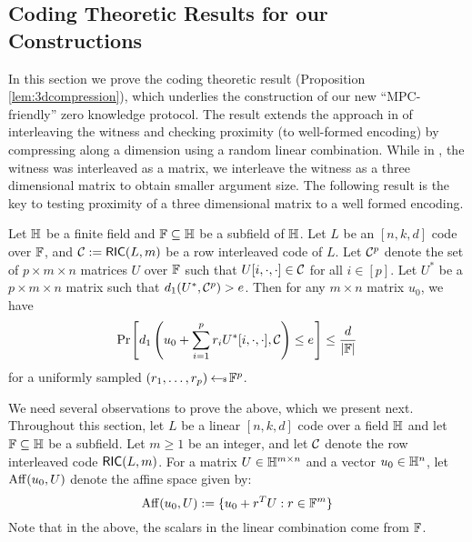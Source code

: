 \subsection{Coding Theoretic Results for our Constructions}
In this section we prove the coding theoretic result (Proposition \ref{lem:3dcompression}), which underlies
the construction of our new ``MPC-friendly'' zero knowledge protocol. The result
extends the approach in \cite{ligero}  of interleaving the witness and checking proximity (to well-formed encoding) by
compressing along a dimension using a random linear combination. 
While in \cite{ligero}, the witness was interleaved as a matrix,
we interleave the witness as a three dimensional matrix to obtain smaller
argument size. The following result is the key to testing proximity of a three
dimensional matrix to a well formed encoding.
\begin{proposition}[3D Compression]\label{lem:3dcompression}
Let $\mathbb{H}$ be a finite field and $\mathbb{F}\subseteq \mathbb{H}$ be a subfield of $\mathbb{H}$. Let $L$ be an $[n,k,d]$ code over $\mathbb{F}$, and $\mathcal{C} :=
\mathsf{RIC}(L,m)$ be a row interleaved code of $L$. Let $\mathcal{C}^p$ denote the set of
$p\times m\times n$ matrices $U$ over $\mathbb{F}$ such that $U[i,\cdot,\cdot]\in
\mathcal{C}$ for all $i\in [p]$. Let $U^\ast$ be a
$p\times m\times n$ matrix such that $d_1(U^\ast,\mathcal{C}^p)>e$. Then for any
$m\times n$ matrix $u_0$, we have 
\[ \prob{d_1\left(u_0 + \sum_{i=1}^p r_iU^\ast[i,\cdot,\cdot], \mc{C}\right)\leq e}\leq
\frac{d}{|\FF|}\]  
for a uniformly sampled $(r_1,\ldots,r_p)\hskip2.3pt{\gets\!\!\mbox{\tiny${\$}$\normalsize}}\, \mathbb{F}^p$. 
\end{proposition}

We need several observations to prove the above, which we present next.
Throughout this section, let $L$ be a linear $[n,k,d]$ code over a field $\mathbb{H}$ and let $\mathbb{F}\subseteq \mathbb{H}$ be a subfield.  Let $m\geq 1$ be an integer, and let $\mathcal{C}$ denote the row interleaved code $\mathsf{RIC}(L,m)$. For a matrix $U\in \mathbb{H}^{m\times n}$ and a vector $u_0\in \mathbb{H}^n$, let ${\rm Aff}({u_0},{U})$ denote the affine space given by:
\begin{equation}\label{eq:affspace}
{\rm Aff}({u_0},{U}) := \{u_0+r^TU: r\in \mathbb{F}^m\}
\end{equation}
Note that in the above, the scalars in the linear combination come from $\mathbb{F}$.

